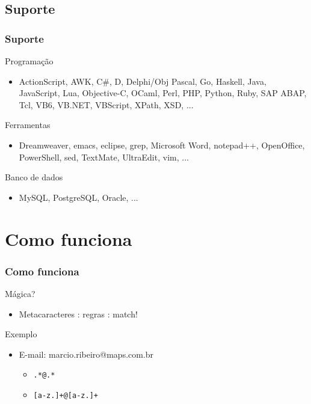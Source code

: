 \documentclass{beamer}
\begin{document}
\subsection{Suporte}
\begin{frame}
 \frametitle{Suporte}
 \begin{block}{Programação}
  \begin{itemize}
   \item ActionScript, AWK, C\#, D, Delphi/Obj Pascal, Go, Haskell, Java, JavaScript, Lua, Objective-C, OCaml, Perl, PHP, Python, Ruby, SAP ABAP, Tcl, VB6, VB.NET, VBScript, XPath, XSD, ...
  \end{itemize}
 \end{block}

 \pause
 \begin{block}{Ferramentas}
  \begin{itemize}
   \item Dreamweaver, emacs, eclipse, grep, Microsoft Word, notepad++, OpenOffice, PowerShell, sed, TextMate, UltraEdit, vim, ...

  \end{itemize}
 \end{block}

 \pause
 \begin{block}{Banco de dados}
  \begin{itemize}
   \item MySQL, PostgreSQL, Oracle, ...
  \end{itemize}
 \end{block}
\end{frame}

\section{Como funciona}
\begin{frame}
 \frametitle{Como funciona}
 \begin{block}{Mágica?}
  \begin{itemize}
   \item Metacaracteres \pause: regras \pause: match!
  \end{itemize}
 \end{block}

 \pause
 \begin{block}{Exemplo}
  \begin{itemize}
   \item E-mail: marcio.ribeiro@maps.com.br
	\pause
	\begin{itemize}
	 \item \texttt{.*@.*}
	  \pause
	 \item \texttt{[a-z.]+@[a-z.]+}
	\end{itemize}
  \end{itemize}
 \end{block}
\end{frame}
\end{document}
